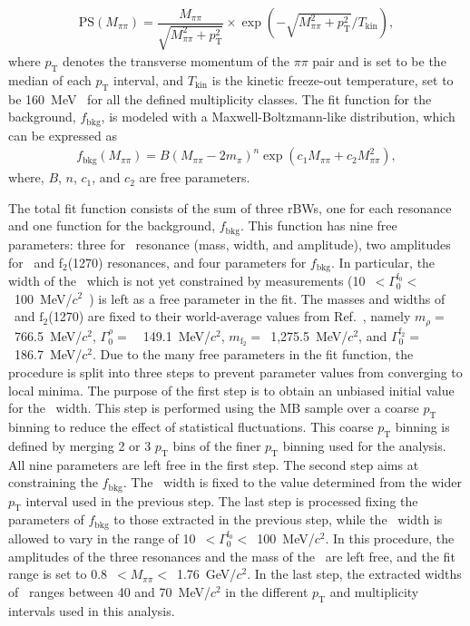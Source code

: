 \begin{eqnarray}
\mathrm{PS}(M_{\pi\pi}) = \dfrac{M_{\pi\pi}}{\sqrt{M_{\pi\pi}^{2}+p_{\mathrm{T}}^{2}}}\times\exp{(-\sqrt{M_{\pi\pi}^{2}+p_{\mathrm{T}}^{2}}/T_{\mathrm{kin}})},
\label{eq:ps}
\end{eqnarray} 
where $p_{\mathrm{T}}$ denotes the transverse momentum of the $\pi\pi$ pair and is set to be the median of each $p_{\mathrm{T}}$ interval, and $T_{\mathrm{kin}}$ is the kinetic freeze-out temperature, set to be 160~MeV~\cite{ALICE:2018qdv} for all the defined multiplicity classes. The fit function for the background, $f_{\mathrm{bkg}}$, is modeled with a Maxwell-Boltzmann-like distribution, which can be expressed as~\cite{OPAL:1998enc}
\begin{eqnarray}
f_{\mathrm{bkg}}(M_{\pi\pi}) = B(M_{\pi\pi}-2m_{\pi})^{n}\exp{(c_{1}M_{\pi\pi} + c_{2}M_{\pi\pi}^{2})},
\label{eq:bkg}
\end{eqnarray} 
where, $B$, $n$, $c_{1}$, and $c_{2}$ are free parameters. 

The total fit function consists of the sum of three rBWs, one for each resonance and one function for the background, $f_{\mathrm{bkg}}$. This function has nine free parameters: three for \fzero~resonance (mass, width, and amplitude), two amplitudes for \rhoz~and f$_{2}$(1270) resonances, and four parameters for $f_{\mathrm{bkg}}$. In particular, the width of the \fzero~which is not yet constrained by measurements (10~$<\Gamma_{0}^{\mathrm{f}_{0}}<$~100~MeV/$c^{2}$~\cite{ParticleDataGroup:2022pth}) is left as a free parameter in the fit. The masses and widths of \rhoz~and $\mathrm{f}_{2}$(1270) are fixed to their world-average values from Ref.~\cite{ParticleDataGroup:2022pth}, namely $m_{\rho}=$~766.5~MeV/$c^{2}$, $\Gamma^{\rho}_{0}=$~~149.1~MeV/$c^{2}$, $m_{\mathrm{f}_{2}}=$~1,275.5~MeV/$c^{2}$, and $\Gamma^{\mathrm{f}_{2}}_{0}=$~186.7~MeV/$c^{2}$. Due to the many free parameters in the fit function, the procedure is split into three steps to prevent parameter values from converging to local minima. The purpose of the first step is to obtain an unbiased initial value for the \fzero~width. This step is performed using the MB sample over a coarse $p_{\mathrm{T}}$ binning to reduce the effect of statistical fluctuations. This coarse $p_{\mathrm{T}}$ binning is defined by merging 2 or 3 $p_{\mathrm{T}}$ bins of the finer $p_{\mathrm{T}}$ binning used for the analysis. All nine parameters are left free in the first step. The second step aims at constraining the $f_{\mathrm{bkg}}$. The \fzero~width is fixed to the value determined from the wider $p_{\mathrm{T}}$ interval used in the previous step. The last step is processed fixing the parameters of $f_{\mathrm{bkg}}$ to those extracted in the previous step, while the \fzero~width is allowed to vary in the range of 10~$<\Gamma_{0}^{\mathrm{f}_{0}}<$~100~MeV/$c^{2}$. In this procedure, the amplitudes of the three resonances and the mass of the \fzero~are left free, and the fit range is set to 0.8~$<M_{\pi\pi}<$~1.76~GeV/$c^{2}$. In the last step, the extracted widths of \fzero~ranges between 40 and 70~MeV/$c^{2}$ in the different $p_{\mathrm{T}}$ and multiplicity intervals used in this analysis.

